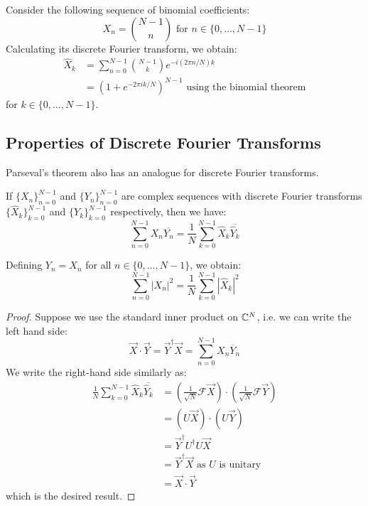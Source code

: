 \documentclass[../main.tex]{subfiles}
\begin{document}
\begin{example}
  Consider the following sequence of binomial coefficients: \label{binomialEx}
  \[
    X_n = \binom{N - 1}{n} \text{ for } n \in \{0, \ldots, N - 1\}
  \]
  Calculating its discrete Fourier transform, we obtain:
  \begin{align*}
    \hat{X}_k &= \sum_{n = 0}^{N - 1} \binom{N - 1}{k} e^{-i(2 \pi n/N)k} \\
              &= (1 + e^{-2\pi i k/N})^{N-1} \text{ using the binomial theorem}
  \end{align*}
  for $k \in \{0, \ldots, N - 1\}$.
\end{example}
\subsection{Properties of Discrete Fourier Transforms}
Parseval's theorem also has an analogue for discrete Fourier transforms.
\begin{proposition}
  If $\{X_n\}_{n = 0}^{N - 1}$ and $\{Y_n\}_{n = 0}^{N - 1}$ are complex sequences with discrete Fourier transforms $\{\hat{X}_k\}_{k = 0}^{N - 1}$ and $\{Y_k\}_{k = 0}^{N - 1}$ respectively, then we have: \label{parseDFT}
  \[
    \sum_{n = 0}^{N - 1} X_n \overline{Y_n} = \frac{1}{N} \sum_{k = 0}^{N - 1} \hat{X}_k \overline{\hat{Y}_k}
  \]
\end{proposition}
\begin{remark}
  Defining $Y_n = X_n$ for all $n \in \{0, \ldots, N - 1\}$, we obtain:
  \[
    \sum_{n = 0}^{N - 1} |X_n|^2 = \frac{1}{N} \sum_{k = 0}^{N - 1} |\hat{X}_k|^2
  \]
\end{remark}
\begin{proof}
  Suppose we use the standard inner product on $\mathbb{C}^{N}$, i.e. we can write the left hand side:
  \[
    \vec{X} \cdot \vec{Y} = \vec{Y}^{\dag} \vec{X} = \sum_{n = 0}^{N - 1} X_n \overline{Y}_n
  \]
  We write the right-hand side similarly as:
  \begin{align*}
    \frac{1}{N} \sum_{k = 0}^{N - 1} \hat{X}_k \overline{\hat{Y}_k} &= \left(\frac{1}{\sqrt{N}} \mathcal{F}\vec{X}\right) \cdot \left(\frac{1}{\sqrt{N}} \mathcal{F}\vec{Y}\right) \\
                                                                    &= (U \vec{X}) \cdot (U \vec{Y}) \\
                                                                    &= \vec{Y}^{\dag} U^{\dag} U \vec{X} \\
                                                                    &= \vec{Y}^{\dag} \vec{X} \text{ as $U$ is unitary} \\
                                                                    &= \vec{X} \cdot \vec{Y}
  \end{align*}
  which is the desired result.
\end{proof}
\end{document}
